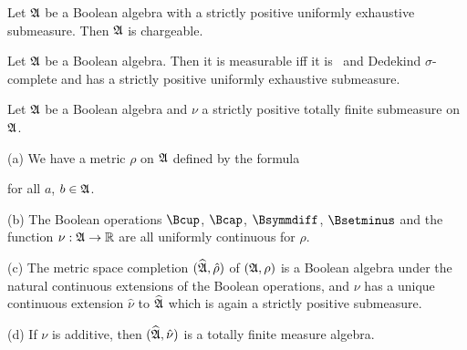  Let $\frak A$ be a Boolean algebra with a
strictly positive uniformly exhaustive submeasure.   Then $\frak A$
is chargeable.


 Let $\frak A$ be a Boolean algebra.   Then it is
measurable iff it is \wsid\ and Dedekind $\sigma$-complete and has a
strictly positive uniformly exhaustive submeasure.


 Let
$\frak A$ be a Boolean algebra and $\nu$ a
strictly positive totally finite submeasure on $\frak A$.

(a) We have a metric $\rho$ on $\frak A$ defined by the formula


\noindent for all $a$, $b\in\frak A$.

(b) The Boolean operations $\Bcup$, $\Bcap$, $\Bsymmdiff$, $\Bsetminus$
and the function $\nu:\frak A\to\Bbb R$ are all uniformly continuous
for $\rho$.

(c) The metric space completion $(\widehat{\frak A},\hat\rho)$ of
$(\frak A,\rho)$ is a Boolean algebra under the natural continuous
extensions of the Boolean operations, and $\nu$ has a unique continuous
extension $\hat\nu$ to $\widehat{\frak A}$ which is again a strictly
positive submeasure.

(d) If $\nu$ is additive, then $(\widehat{\frak A},\hat\nu)$ is a
totally finite measure algebra.

